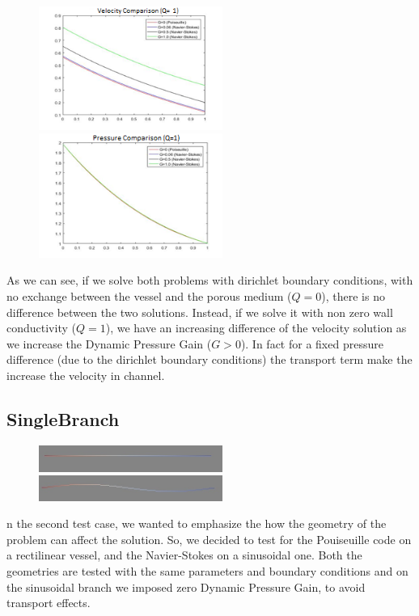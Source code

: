 \documentclass[a4paper]{report}
\begin{document}
\begin{figure}[htbp]
\centering
\includegraphics[width= 60mm]{Pressure_Gain_2}%
\qquad \qquad
\includegraphics[width= 60mm]{Pressure_Gain_3}
\end{figure}
As we can see, if we solve both problems with dirichlet boundary conditions, with no exchange between the vessel and the porous medium ($Q=0$), there is no difference between the two solutions. Instead, if we solve it with non zero wall conductivity ($Q=1$), we have an increasing difference of the velocity solution as we increase the Dynamic Pressure Gain ($G>0$). In fact for a fixed pressure difference (due to the dirichlet boundary conditions) the transport term make the increase the velocity in channel.

\subsection{SingleBranch}

\begin{figure}[htbp]
\centering
\includegraphics[width= 60mm]{SingleBranch_Rettilineo}%
\qquad \qquad
\includegraphics[width= 60mm]{SingleBranch_Curvo}
\end{figure}
n the second test case, we wanted to emphasize the how the geometry of the problem can affect the solution. So, we decided to test for the Pouiseuille code on a rectilinear vessel, and the Navier-Stokes on a sinusoidal one.  Both the geometries are tested with the same parameters and boundary conditions and on the sinusoidal branch we imposed zero Dynamic Pressure Gain, to avoid transport effects.
\end{document}
